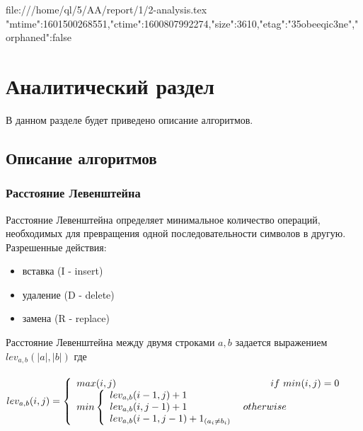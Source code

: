 file:///home/ql/5/AA/report/1/2-analysis.tex {"mtime":1601500268551,"ctime":1600807992274,"size":3610,"etag":"35obeeqic3ne","orphaned":false}
\chapter{Аналитический раздел}
\label{cha:analysis}

В данном разделе будет приведено описание алгоритмов.


\section{Описание алгоритмов}

\subsection{Расстояние Левенштейна}

Расстояние Левенштейна определяет минимальное количество операций,
необходимых для превращения одной последовательности символов в другую.
Разрешенные действия:

\begin{itemize}
    \setlength{\itemsep}{0em}
    \item вставка (I - insert)
    \item удаление (D - delete)
    \item замена (R - replace)
\end{itemize}


Расстояние Левенштейна между двумя строками $a, b$ задается выражением $lev_{a,b}(|a|,|b|)$ где
\\\\

$
lev_{a,b}(i,j) = \left\{
    \begin{array}{ll}
        max(i,j)        \hspace{5.5cm} if \ min(i,j) = 0\\
        min \left\{
            \begin{array}{ll}
                lev_{a,b}(i-1,j) + 1    \\
                lev_{a,b}(i,j-1) + 1    \hspace{2cm} otherwise\\
                lev_{a,b}(i-1,j-1) + 1_{(a_i \ne b_i)}\\
            \end{array}
            \right.\\
    \end{array}
\right.
$\\\\

